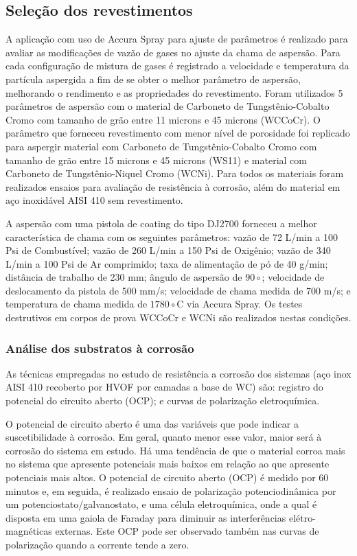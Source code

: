 \subsection{Seleção dos revestimentos}

A aplicação com uso de Accura Spray para ajuste de parâmetros é
realizado para avaliar as modificações de vazão de gases no ajuste da
chama de aspersão. Para cada configuração de mistura de gases é registrado a
velocidade e temperatura da partícula aspergida a fim de se obter o melhor
parâmetro de aspersão, melhorando o rendimento e as propriedades do
revestimento. Foram utilizados 5 parâmetros de aspersão com o material de
Carboneto de Tungstênio-Cobalto Cromo com tamanho de grão entre 11 microns e 45 microns
(WCCoCr). O parâmetro que forneceu revestimento com menor nível de porosidade
foi replicado para aspergir material com Carboneto de Tungstênio-Cobalto Cromo
com tamanho de grão entre 15 microns e 45 microns (WS11) e material com
Carboneto de Tungstênio-Niquel Cromo (WCNi). Para todos os materiais foram
realizados ensaios para avaliação de resistência à corrosão, além do material
em aço inoxidável AISI 410 sem revestimento.

A aspersão com uma pistola de coating do tipo DJ2700 forneceu a
melhor característica de chama com os seguintes parâmetros: vazão de 72 L/min a
100 Psi de Combustível; vazão de 260 L/min a 150 Psi de Oxigênio; vazão de 340
L/min a 100 Psi de Ar comprimido; taxa de alimentação de pó de 40 g/min;
distância de trabalho de 230 mm; ângulo de aspersão de $90\circ$; velocidade de
deslocamento da pistola de 500 mm/s; velocidade de chama medida de 700 m/s; e
temperatura de chama medida de $1780\circ$C via Accura Spray. Os testes
destrutivos em corpos de prova WCCoCr e WCNi são realizados nestas condições.

\subsubsection{Análise dos substratos à corrosão}
As técnicas empregadas no estudo de resistência a corrosão dos sistemas (aço
inox AISI 410 recoberto por HVOF por camadas a base de WC) são: registro do
potencial do circuito aberto (OCP); e curvas de polarização eletroquímica. 

O potencial de circuito aberto é uma das variáveis que pode indicar a
suscetibilidade à corrosão. Em geral, quanto menor esse valor, maior será à
corrosão do sistema em estudo. Há uma tendência de que o material corroa mais no
sistema que apresente potenciais mais baixos em relação ao que apresente
potenciais mais altos. O potencial de circuito aberto (OCP) é medido por 60
minutos e, em seguida, é realizado ensaio de polarização potenciodinâmica
por um potenciostato/galvanostato, e uma célula eletroquímica,
onde a qual é disposta em uma gaiola de Faraday para diminuir as interferências
elétro-magnéticas externas. Este OCP pode ser observado também nas curvas
de polarização quando a corrente tende a zero.


